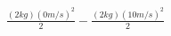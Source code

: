 \documentclass[preview]{standalone}
\begin{document}
\begin{align*}
\frac{(2 kg)(0 m/s)^2}{2} - \frac{(2 kg)(10 m/s)^2}{2}
\end{align*}
\end{document}
